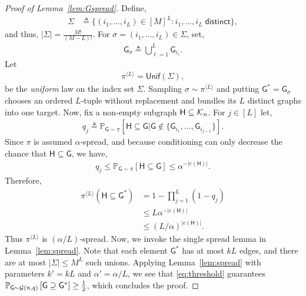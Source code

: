 \documentclass[12pt]{article}
\def\P{{\mathbb P}}
\newcommand {\pr} {\mathbb{P}}
\newcommand{\calG}{{\cal G}}
\newcommand{\calK}{{\cal K}}
\newcommand{\p}[1]{\left(#1\right)}
\newcommand{\pp}[1]{\left[#1\right]}
\newcommand{\s}[1]{\mathsf{#1}}
\begin{document}
\begin{proof}[Proof of Lemma~\ref{lem:Gspread}]
Define,
\begin{align}
  \Sigma &\triangleq
  \bigl\{ (i_{1},\dots ,i_{L})\in[M]^{L}:
          i_{1},\dots ,i_{L}\;\s{distinct}\bigr\},
\end{align}
and thus, $|\Sigma|=\frac{M!}{(M-L)!}$. 
For $\sigma=(i_{1},\dots ,i_{L})\in\Sigma$, set,
\begin{align}
  \s{G}_{\sigma}\triangleq\bigcup_{\ell=1}^L\s{G}_{i_{\ell}}.
\end{align}
Let
\begin{align}
  \pi^{\langle L\rangle} = \s{Unif}(\Sigma),
\end{align}
be the \emph{uniform} law on the index set $\Sigma$. Sampling $\sigma\sim\pi^{\langle L\rangle}$ and putting
$\s{G}^{\ast}=\s{G}_{\sigma}$ chooses an ordered $L$‑tuple without replacement and bundles its $L$ distinct graphs into one target. Now, fix a non‑empty subgraph $\s{H}\subseteq \calK_{n}$.  
For $j\in[L]$ let,
\begin{align}
  q_{j}\triangleq
  \pr_{\s{G}\sim\pi}\pp{\s{H}\subseteq \s{G}\vert\s{G}\notin\{\s{G}_{i_{1}},\dots ,\s{G}_{i_{j-1}}\}}.
\end{align}
Since $\pi$ is assumed $\alpha$‑spread, and because conditioning can only decrease the chance that $\s{H}\subseteq \s{G}$, we have,
\begin{align}
    q_{j}\leq \pr_{\s{G}\sim\pi}\pp{\s{H}\subseteq \s{G}}\leq\alpha^{-|e(\s{H})|}.
\end{align}
Therefore,
\begin{align}
  \pi^{\langle L\rangle}\p{\s{H}\subseteq \s{G}^{\ast}}&=  1-\prod_{j=1}^{L}(1-q_{j})\\
  &\leq L\alpha^{-|e(\s{H})|}\\
  & \leq (L/\alpha)^{|e(\s{H})|}.
\end{align}
Thus $\pi^{\langle L\rangle}$ is $(\alpha/L)$‑spread. Now, we invoke the single spread lemma in Lemma~\ref{lem:spread}. Note that each element $\s{G}^{\ast}$ has at most $kL$ edges, and there are at most
$|\Sigma|\leq  M^{L}$ such unions. Applying Lemma~\ref{lem:spread} with parameters $k' = kL$ and $\alpha' = \alpha/L$, we see that \eqref{eq:threshold} guarantees
$\P_{\s{G}\sim \calG(n,q)}\pp{\s{G}\supseteq \s{G}^{\ast}}\ge\tfrac12$, which concludes the proof.
\end{proof}
\end{document}
